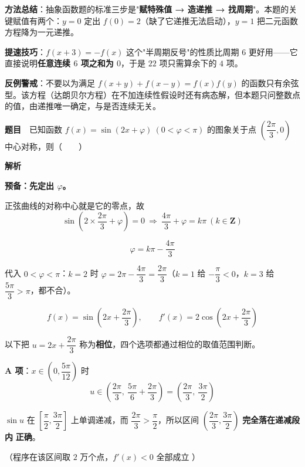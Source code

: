 
\begin{gktip}
\textbf{方法总结}：抽象函数题的标准三步是"\textbf{赋特殊值 → 造递推 → 找周期}"。本题的关键赋值有两个：$y=0$ 定出 $f(0)=2$（缺了它递推无法启动），$y=1$ 把二元函数方程降为一元递推。

\textbf{提速技巧}：$f(x+3)=-f(x)$ 这个"半周期反号"的性质比周期 $6$ 更好用——它直接说明\textbf{任意连续 $6$ 项之和为 $0$}，于是 $22$ 项只需算余下的 $4$ 项。

\textbf{反例警戒}：不要以为满足 $f(x+y)+f(x-y)=f(x)f(y)$ 的函数只有余弦型。该方程（达朗贝尔方程）在不加连续性假设时还有病态解，但本题只问整数点的值，由递推唯一确定，与是否连续无关。
\end{gktip}

\par\medskip



\textbf{题目}　已知函数 $f(x)=\sin(2x+\varphi)\ (0<\varphi<\pi)$ 的图象关于点 $\left(\dfrac{2\pi}3,0\right)$ 中心对称，则（　　）

\textbf{解析}

\textbf{预备：先定出 $\varphi$。}

正弦曲线的对称中心就是它的零点，故
\[\sin\left(2\times\frac{2\pi}3+\varphi\right)=0\ \Longrightarrow\ \frac{4\pi}3+\varphi=k\pi\ (k\in\mathbf Z)\]

\[\varphi=k\pi-\frac{4\pi}3\]

代入 $0<\varphi<\pi$：$k=2$ 时 $\varphi=2\pi-\dfrac{4\pi}3=\dfrac{2\pi}3$（$k=1$ 给 $-\dfrac\pi3<0$，$k=3$ 给 $\dfrac{5\pi}3>\pi$，都不合）。

\[\boxed{f(x)=\sin\left(2x+\frac{2\pi}3\right)},\qquad f'(x)=2\cos\left(2x+\frac{2\pi}3\right)\]

以下把 $u=2x+\dfrac{2\pi}3$ 称为\textbf{相位}，四个选项都通过相位的取值范围判断。

\par\medskip

\textbf{A 项}：$x\in\left(0,\dfrac{5\pi}{12}\right)$ 时
\[u\in\left(\frac{2\pi}3,\ \frac{5\pi}6+\frac{2\pi}3\right)=\left(\frac{2\pi}3,\ \frac{3\pi}2\right)\]

$\sin u$ 在 $\left[\dfrac\pi2,\dfrac{3\pi}2\right]$ 上单调递减，而 $\dfrac{2\pi}3>\dfrac\pi2$，所以区间 $\left(\dfrac{2\pi}3,\dfrac{3\pi}2\right)$ \textbf{完全落在递减段内}  \textbf{正确}。

（程序在该区间取 $2$ 万个点，$f'(x)<0$ 全部成立 ）


